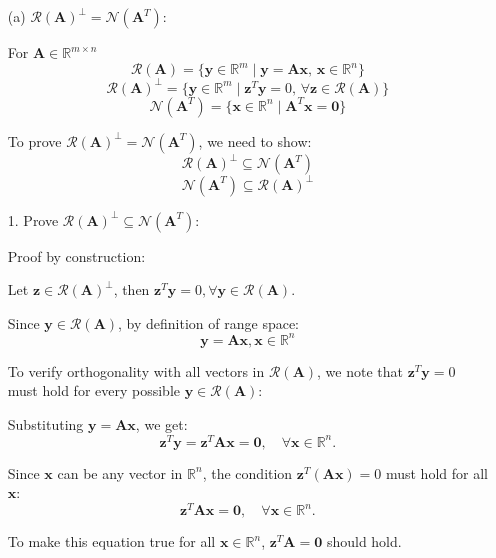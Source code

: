 \documentclass[12pt]{article}
\newcommand{\bvec}[1]{\mathbf{#1}} %
\begin{document}
\begin{itemize}
    \item[(a)]  \( \mathcal{R}(\mathbf{A})^\perp = \mathcal{N}(\mathbf{A}^T) \):

For $\bvec{A} \in \mathbb{R}^{m\times n}$
\[ 
\mathcal{R}(\mathbf{A}) = \{ \mathbf{y} \in \mathbb{R}^m \mid \mathbf{y} = \mathbf{A}\mathbf{x}, \, \mathbf{x} \in \mathbb{R}^n \} 
\]
\[ 
\mathcal{R}(\mathbf{A})^\perp = \{ \mathbf{y} \in \mathbb{R}^m \mid \mathbf{z}^T \mathbf{y} = 0, \, \forall \mathbf{z} \in \mathcal{R}(\mathbf{A}) \}
\]
\[ 
\mathcal{N}(\mathbf{A}^T) = \{ \mathbf{x} \in \mathbb{R}^n \mid \mathbf{A}^T \mathbf{x} = \mathbf{0} \} 
\]

    
To prove \( \mathcal{R}(\mathbf{A})^\perp = \mathcal{N}(\mathbf{A}^T) \), we need to show:
 \[
 \mathcal{R}(\mathbf{A})^\perp \subseteq \mathcal{N}(\mathbf{A}^T) 
 \]
 \[ 
 \mathcal{N}(\mathbf{A}^T) \subseteq \mathcal{R}(\mathbf{A})^\perp 
 \]

    \vspace{\baselineskip}

    1. Prove \( \mathcal{R}(\mathbf{A})^\perp \subseteq \mathcal{N}(\mathbf{A}^T) \):
    \vspace{\baselineskip}
    
    Proof by construction:
    
    Let \( \mathbf{z} \in \mathcal{R}(\mathbf{A})^\perp \), then \( \mathbf{z}^T \mathbf{y} = 0, 
    \forall \mathbf{y} \in \mathcal{R}(\mathbf{A}) \).  

    
    Since \( \mathbf{y} \in \mathcal{R}(\mathbf{A}) \), by definition of range space:
    \[
    \bvec{y}=\bvec{Ax}, \bvec{x} \in \mathbb{R}^n
    \]
    
    To verify orthogonality with all vectors in \( \mathcal{R}(\mathbf{A}) \), we note that \( \mathbf{z}^T \mathbf{y} = 0 \) must hold for every possible \( \mathbf{y} \in \mathcal{R}(\mathbf{A}) \):
     
     Substituting \( \mathbf{y} = \mathbf{A} \mathbf{x} \), we get:
    \[
    \mathbf{z}^T \mathbf{y} = \mathbf{z}^T \mathbf{A} \mathbf{x} = \bvec{0}, \quad \forall \mathbf{x} \in \mathbb{R}^n. 
    \]
    
    
    Since \( \mathbf{x} \) can be any vector in \( \mathbb{R}^n \), the condition \( \mathbf{z}^T (\mathbf{A} \mathbf{x}) = 0 \) must hold for all \( \mathbf{x} \):
    \[
    \mathbf{z}^T \mathbf{A} \mathbf{x} = \bvec{0}, \quad \forall \mathbf{x} \in \mathbb{R}^n. 
    \]
    
    
    To make this equation true for all \( \mathbf{x} \in \mathbb{R}^n \), \( \mathbf{z}^T \mathbf{A} = \bvec{0} \) should hold.  
    

\end{itemize}
\end{document}

